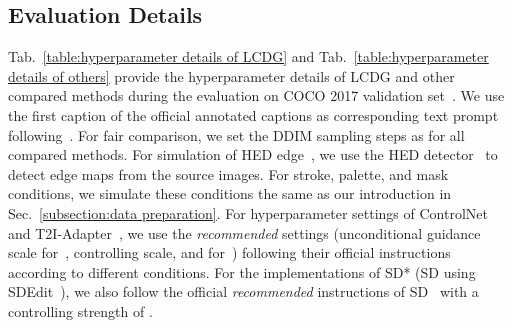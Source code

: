 \documentclass{article}
\begin{document}
\begin{table}[t]
  \centering
  \small
  \caption{Hyperparameter details of other compared methods for the evaluation upon COCO 2017 validation set~\cite{lin2014microsoft}. We try to ensure all compared methods using the same diffusion backbone (SD v) for fair comparison. Note that ControlNet~\cite{zhang2023adding} only implements their methods based upon SD~\cite{rombach2022high} with version of .}
  \setlength{\tabcolsep}{0.65mm}
  \label{table:hyperparameter details of others}
\end{table}

\subsection{Evaluation Details}
Tab.~\ref{table:hyperparameter details of LCDG} and Tab.~\ref{table:hyperparameter details of others} provide the hyperparameter details of LCDG and other compared methods during the evaluation on COCO 2017 validation set~\cite{lin2014microsoft}. We use the first caption of the official annotated captions as corresponding text prompt following~\cite{mou2023t2i}. For fair comparison, we set the DDIM sampling steps as  for all compared methods. For simulation of HED edge~\cite{xie2015holistically}, we use the HED detector~\cite{xie2015holistically} to detect edge maps from the source images. For stroke, palette, and mask conditions, we simulate these conditions the same as our introduction in Sec.~\ref{subsection:data preparation}. For hyperparameter settings of ControlNet~\cite{zhang2023adding} and T2I-Adapter~\cite{mou2023t2i}, we use the \textit{recommended} settings (unconditional guidance scale for~\cite{ho2022classifier}, controlling scale, and  for~\cite{mou2023t2i}) following their official instructions according to different conditions. For the implementations of SD* (SD using SDEdit~\cite{meng2021sdedit}), we also follow the official 
\textit{recommended} instructions of SD~\cite{rombach2022high} with a controlling strength of .
\end{document}
